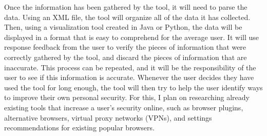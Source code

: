\documentclass[11pt]{article}
\begin{document}
Once the information has been gathered by the tool, it will need to parse the data. Using an XML file, the tool will organize all of the data it has collected. Then, using a visualization tool created in Java or Python, the data will be displayed in a format that is easy to comprehend for the average user. It will use response feedback from the user to verify the pieces of information that were correctly gathered by the tool, and discard the pieces of information that are inaccurate. This process can be repeated, and it will be the responsibility of the user to see if this information is accurate. Whenever the user decides they have used the tool for long enough, the tool will then try to help the user identify ways to improve their own personal security. For this, I plan on researching already existing tools that increase a user's security online, such as browser plugins, alternative browsers, virtual proxy networks (VPNs), and settings recommendations for existing popular browsers.
\end{document}
